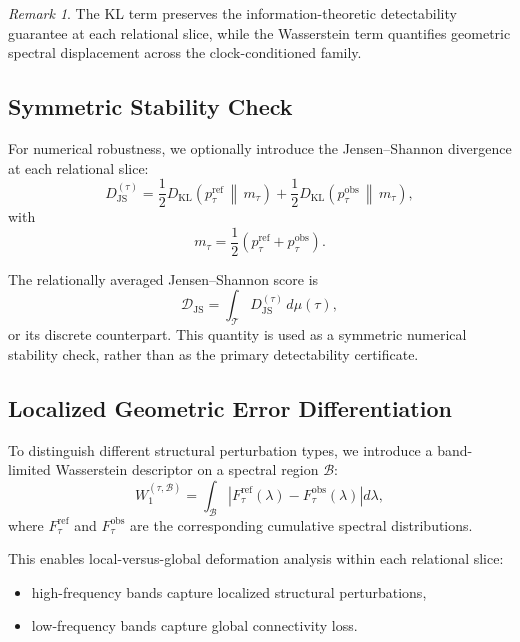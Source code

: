 \documentclass[11pt,a4paper]{article}
\theoremstyle{definition}
\theoremstyle{remark}
\newtheorem{remark}[theorem]{Remark}
\begin{document}
\begin{remark}
The KL term preserves the information-theoretic detectability guarantee at each relational
slice, while the Wasserstein term quantifies geometric spectral displacement across the
clock-conditioned family.
\end{remark}

\subsection{Symmetric Stability Check}

For numerical robustness, we optionally introduce the Jensen--Shannon divergence at each
relational slice:
\begin{equation}
  D_{\mathrm{JS}}^{(\tau)}
    = \frac{1}{2}
      D_{\mathrm{KL}}\!\left(p_{\tau}^{\mathrm{ref}} \,\middle\|\, m_{\tau}\right)
      + \frac{1}{2}
      D_{\mathrm{KL}}\!\left(p_{\tau}^{\mathrm{obs}} \,\middle\|\, m_{\tau}\right),
\end{equation}
with
\begin{equation}
  m_{\tau} = \frac{1}{2}\left(p_{\tau}^{\mathrm{ref}} + p_{\tau}^{\mathrm{obs}}\right).
\end{equation}

The relationally averaged Jensen--Shannon score is
\begin{equation}
  \mathcal{D}_{\mathrm{JS}}
    = \int_{\mathcal{T}} D_{\mathrm{JS}}^{(\tau)}\,d\mu(\tau),
\end{equation}
or its discrete counterpart.  This quantity is used as a symmetric numerical stability check,
rather than as the primary detectability certificate.

\subsection{Localized Geometric Error Differentiation}

To distinguish different structural perturbation types, we introduce a band-limited Wasserstein
descriptor on a spectral region $\mathcal{B}$:
\begin{equation}
  W_1^{(\tau,\mathcal{B})}
    = \int_{\mathcal{B}}
      \left|F_{\tau}^{\mathrm{ref}}(\lambda) - F_{\tau}^{\mathrm{obs}}(\lambda)\right|
      d\lambda,
\end{equation}
where $F_{\tau}^{\mathrm{ref}}$ and $F_{\tau}^{\mathrm{obs}}$ are the corresponding cumulative
spectral distributions.

This enables local-versus-global deformation analysis within each relational slice:
\begin{itemize}
  \item high-frequency bands capture localized structural perturbations,
  \item low-frequency bands capture global connectivity loss.
\end{itemize}
\end{document}
